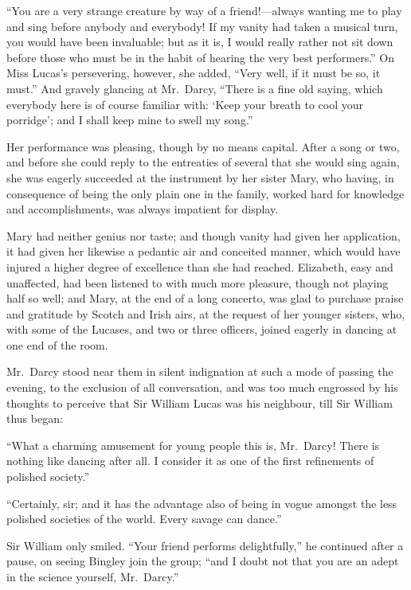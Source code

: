 \documentclass[12pt,english]{book}
\begin{document}
{}``You are a very strange creature by way of a friend!\mbox{---}always
wanting me to play and sing before anybody and everybody! If my vanity
had taken a musical turn, you would have been invaluable; but as it
is, I would really rather not sit down before those who must be in
the habit of hearing the very best performers.'' On Miss Lucas's
persevering, however, she added, {}``Very well, if it must be so,
it must.'' And gravely glancing at Mr.\ Darcy, {}``There is a fine
old saying, which everybody here is of course familiar with: `Keep
your breath to cool your porridge'; and I shall keep mine to swell
my song.''

Her performance was pleasing, though by no means capital. After a
song or two, and before she could reply to the entreaties of several
that she would sing again, she was eagerly succeeded at the instrument
by her sister Mary, who having, in consequence of being the only plain
one in the family, worked hard for knowledge and accomplishments,
was always impatient for display.

Mary had neither genius nor taste; and though vanity had given her
application, it had given her likewise a pedantic air and conceited
manner, which would have injured a higher degree of excellence than
she had reached. Elizabeth, easy and unaffected, had been listened
to with much more pleasure, though not playing half so well; and Mary,
at the end of a long concerto, was glad to purchase praise and gratitude
by Scotch and Irish airs, at the request of her younger sisters, who,
with some of the Lucases, and two or three officers, joined eagerly
in dancing at one end of the room.

Mr.\ Darcy stood near them in silent indignation at such a mode of
passing the evening, to the exclusion of all conversation, and was
too much engrossed by his thoughts to perceive that Sir William Lucas
was his neighbour, till Sir William thus began:

{}``What a charming amusement for young people this is, Mr.\ Darcy!
There is nothing like dancing after all. I consider it as one of the
first refinements of polished society.''

{}``Certainly, sir; and it has the advantage also of being in vogue
amongst the less polished societies of the world. Every savage can
dance.''

Sir William only smiled. {}``Your friend performs delightfully,''
he continued after a pause, on seeing Bingley join the group; {}``and
I doubt not that you are an adept in the science yourself, Mr.\ Darcy.''
\end{document}
